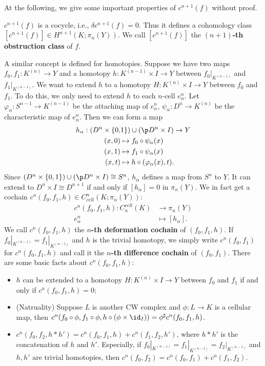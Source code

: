 At the following, we give some important properties of $c^{n+1}(f)$ without 
proof. 
\begin{theorem}
    $c^{n+1}(f)$ is a cocycle, i.e., $\delta c^{n+1}(f) = 0$. Thus it 
    defines a cohomology class $[c^{n+1}(f)]\in H^{n+1}(K;\pi_{n}(Y))$. 
    We call $[c^{n+1}(f)]$ the \textbf{$(n+1)$-th obstruction class} of $f$.
\end{theorem}

A similar concept is defined for homotopies. Suppose we have two maps
$f_0,f_1:K^{(n)}\to Y$ and a homotopy $h:K^{(n-1)}\times I\to Y$ between
$f_0|_{K^{(n-1)}}$ and $f_1|_{K^{(n-1)}}$. We want to extend $h$ to a 
homotopy $H:K^{(n)}\times I\to Y$ between $f_0$ and $f_1$. To do this, 
we only need to extend $h$ to each $n$-cell $e_\alpha^n$. Let 
$\varphi_\alpha:S^{n-1}\to K^{(n-1)}$ be the attaching map of $e_\alpha^n$, 
$\psi_\alpha:D^n\to K^{(n)}$ be the characteristic map of $e_\alpha^n$. Then 
we can form a map
\begin{align*}
    h_\alpha:(D^n\times \{0,&1\})\cup(\p D^n\times I)\to Y \\ 
    (x,0)&\mapsto f_0\circ \psi_\alpha(x) \\
    (x,1)&\mapsto f_1\circ \psi_\alpha(x) \\
    (x,t)&\mapsto h\circ (\varphi_\alpha(x),t).
\end{align*}
Since $(D^n\times \{0,1\})\cup(\p D^n\times I)\cong S^n$, $h_\alpha$ defines
a map from $S^n$ to $Y$. It can extend to $D^n\times I\cong D^{n+1}$ if and 
only if $[h_\alpha] = 0$ in $\pi_n(Y)$. We in fact get a cochain
$c^n(f_0,f_1,h)\in C^n_{cell}(K;\pi_n(Y))$:
\begin{align*}
    c^n(f_0,f_1,h):C_n^{cell}(K) & \to \pi_n(Y) \\
    e_\alpha^n & \mapsto [h_\alpha]. 
\end{align*} 
We call $c^n(f_0,f_1,h)$ the \textbf{$n$-th deformation cochain} of 
$(f_0,f_1,h)$. If $f_0|_{K^{(n-1)}} = f_1|_{K^{(n-1)}}$ and $h$ is the 
trivial homotopy, we simply write $c^n(f_0,f_1)$ for $c^n(f_0,f_1,h)$ and 
call it the \textbf{$n$-th difference cochain} of $(f_0,f_1)$. 
There are some basic facts about $c^n(f_0,f_1,h)$:
\begin{itemize}
    \item $h$ can be extended to a homotopy $H:K^{(n)}\times I\to Y$ between 
    $f_0$ and $f_1$ if and only if $c^n(f_0,f_1,h) = 0$; 
    \item (Natruality) Suppose $L$ is another CW complex and $\phi:L\to K$ 
    is a cellular map, then 
    $c^n(f_0\circ \phi,f_1\circ \phi,h\circ(\phi\times \id_I)) = 
    \phi^{\sharp}c^n(f_0,f_1,h)$.
    \item $c^n(f_0,f_2,h*h') = c^n(f_0,f_1,h) + c^n(f_1,f_2,h')$, where
    $h*h'$ is the concatenation of $h$ and $h'$. Especially, if 
    $f_0|_{K^{(n-1)}} = f_1|_{K^{(n-1)}} = f_2|_{K^{(n-1)}}$ and $h,h'$ are
    trivial homotopies, then $c^n(f_0,f_2) = c^n(f_0,f_1) + c^n(f_1,f_2)$.
\end{itemize}

